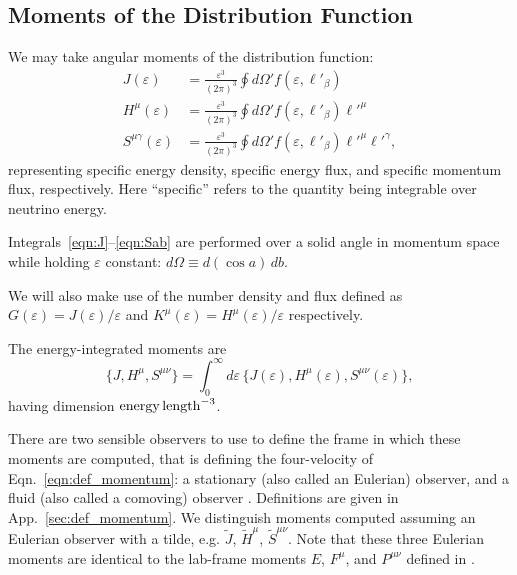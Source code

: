 \documentclass[aps,floatfix,prd,superscriptaddress,twocolumn]{revtex4-1}
\newcommand{\todo}[1]{\marginpar{\tiny{\textcolor{red}{#1}}}}
\renewcommand\todo[1]{} %
\begin{document}
\subsection{Moments of the Distribution Function}
\label{ssec:moments}
\todo{code these up}
We may take angular moments of the distribution function:
\begin{align}
  \label{eqn:J}
  J(\varepsilon) &=
  \frac{\varepsilon^3}{(2\pi)^3} \oint d\Omega' f(\varepsilon, \ell'_\beta) \\
  \label{eqn:Ha}
  H^\mu(\varepsilon) &=
  \frac{\varepsilon^3}{(2\pi)^3} \oint d\Omega' f(\varepsilon, \ell'_\beta) \ell'^\mu \\
  \label{eqn:Sab}
  S^{\mu\gamma}(\varepsilon) &=
  \frac{\varepsilon^3}{(2\pi)^3} \oint d\Omega' f(\varepsilon, \ell'_\beta) \ell'^\mu \ell'^\gamma,
\end{align}
representing specific energy density, specific energy flux, and
specific momentum flux, respectively.
Here ``specific'' refers to the quantity being integrable over neutrino energy.
\todo{relate moments to other frames?}
Integrals~\ref{eqn:J}--\ref{eqn:Sab} are performed over a solid angle in
momentum space while holding $\varepsilon$ constant:
$d\Omega \equiv d(\cos a)\,db$.
\todo{consistent with Eqn.~\ref{eqn:def_direction}?}
We will also make use of the number density and flux defined as
$G(\varepsilon)=J(\varepsilon)/\varepsilon$
and $K^\mu(\varepsilon)=H^\mu(\varepsilon)/\varepsilon$
respectively.

The energy-integrated moments are
\begin{equation}
  \label{eqn:J_H_S_eps_integrated}
  \big\{ J,H^\mu,S^{\mu\nu} \big\} = \int_0^\infty d\varepsilon \,
  \big\{ J(\varepsilon),H^\mu(\varepsilon),S^{\mu\nu}(\varepsilon) \big\},
\end{equation}
having dimension ${\rm energy}\,{\rm length}^{-3}$.

There are two sensible observers to use to define the frame in which these
moments are computed, that is defining the four-velocity of
Eqn.~\ref{eqn:def_momentum}:
a stationary (also called an Eulerian) observer,
and a fluid (also called a comoving) observer \cite{smar1980-gr_hydro}.
Definitions are given in App.~\ref{sec:def_momentum}.
We distinguish moments computed assuming an Eulerian observer with a tilde,
e.g. $\tilde{J}$, $\tilde{H}^\mu$, $\tilde{S}^{\mu\nu}$.
Note that these three Eulerian moments are identical to the lab-frame moments
$E$, $F^\mu$, and $P^{\mu\nu}$
defined in
\cite{shib2011-truncated_moment, ocon2015-gr1d_with_nu, fouc2015-m1_nsbh}.
\end{document}
